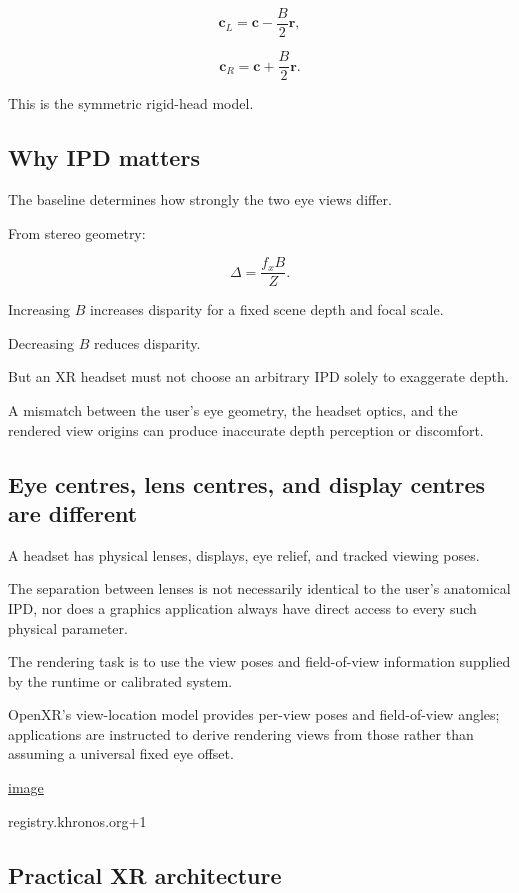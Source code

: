 \[ \boxed{ \mathbf c_L=\mathbf c-\frac B2\mathbf r, } \]

\[ \boxed{ \mathbf c_R=\mathbf c+\frac B2\mathbf r. } \]

This is the symmetric rigid-head model.

\subsection{Why IPD matters}\label{02-foundations-ii-ch035-why-ipd-matters}

The baseline determines how strongly the two eye views differ.

From stereo geometry:

\[ \Delta=\frac{f_xB}{Z}. \]

Increasing \(B\) increases disparity for a fixed scene depth and focal scale.

Decreasing \(B\) reduces disparity.

But an XR headset must not choose an arbitrary IPD solely to exaggerate depth.

A mismatch between the user's eye geometry, the headset optics, and the rendered view origins can produce inaccurate depth perception or discomfort.

\subsection{Eye centres, lens centres, and display centres are different}\label{02-foundations-ii-ch035-eye-centres-lens-centres-and-display-centres-are-different}

A headset has physical lenses, displays, eye relief, and tracked viewing poses.

The separation between lenses is not necessarily identical to the user's anatomical IPD, nor does a graphics application always have direct access to every such physical parameter.

The rendering task is to use the view poses and field-of-view information supplied by the runtime or calibrated system.

OpenXR's view-location model provides per-view poses and field-of-view angles; applications are instructed to derive rendering views from those rather than assuming a universal fixed eye offset. 

\href{https://www.google.com/s2/favicons?domain=https://registry.khronos.org&sz=32}{image}

registry.khronos.org+1

\subsection{Practical XR architecture}\label{02-foundations-ii-ch035-practical-xr-architecture}

